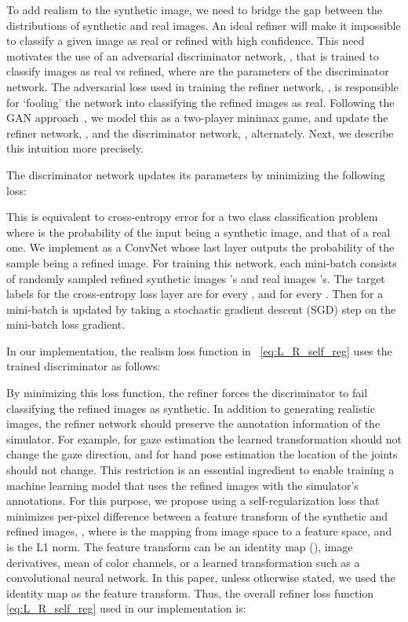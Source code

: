 \documentclass[10pt,twocolumn,letterpaper]{article}
\begin{document}
To add realism to the synthetic image, we need to bridge the gap between the distributions of synthetic and real images. 
An ideal refiner will make it impossible to classify a given image as real or refined with high confidence. 
This need motivates the use of an adversarial discriminator network, , that is trained to classify images as real vs refined, where  are the parameters of the discriminator network. 
The adversarial loss used in training the refiner network, , is responsible for `fooling' the network  into classifying the refined images as real. 
Following the GAN approach~\cite{Goodfellow14}, we model this as a two-player minimax game, and update the refiner network, , and the discriminator network, , alternately. 
Next, we describe this intuition more precisely.

The discriminator network updates its parameters by minimizing the following loss:

This is equivalent to cross-entropy error for a two class classification problem where  is the probability of the input being a synthetic image, and   that of a real one. 
We implement  as a ConvNet whose last layer outputs the probability of the sample being a refined image. 
For training this network, each mini-batch consists of randomly sampled refined synthetic images 's and real images 's. 
The target labels for the cross-entropy loss layer are  for every , and  for every . 
Then  for a mini-batch is updated by taking a stochastic gradient descent (SGD) step on the  mini-batch loss gradient. 

In our implementation, the realism loss function   in ~\eqref{eq:L_R_self_reg} uses the trained discriminator  as follows:

By minimizing this loss function, the refiner forces the discriminator to fail classifying the refined images as synthetic.
In addition to generating realistic images, the refiner network should preserve the annotation information of the simulator. 
For example, for gaze estimation the learned transformation should not change the gaze direction, and for hand pose estimation the location of the joints should not change. 
This restriction is an essential ingredient to enable training a machine learning model that uses the refined images with the simulator's annotations. 
For this purpose, we propose using a self-regularization loss that minimizes per-pixel difference between a feature transform of the synthetic and refined images,  , where
 is the mapping from image space to a feature space, and  is the L1 norm.
The feature transform can be an identity map (), image derivatives, mean of color channels, or a learned transformation such as a convolutional neural network. 
In this paper, unless otherwise stated, we used the identity map as the feature transform. 
Thus, the overall refiner loss function \eqref{eq:L_R_self_reg} used in our implementation is:
\end{document}
